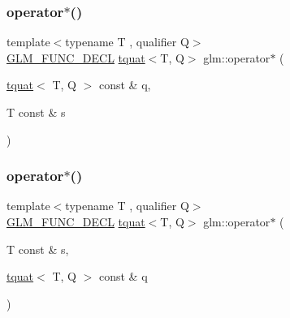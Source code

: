 \subsubsection{\texorpdfstring{operator$\ast$()}{operator*()}\hspace{0.1cm}{\footnotesize\ttfamily [6/7]}}
{\footnotesize\ttfamily template$<$typename T , qualifier Q$>$ \\
\hyperlink{setup_8hpp_ab2d052de21a70539923e9bcbf6e83a51}{G\+L\+M\+\_\+\+F\+U\+N\+C\+\_\+\+D\+E\+CL} \hyperlink{structglm_1_1tquat}{tquat}$<$T, Q$>$ glm\+::operator$\ast$ (\begin{DoxyParamCaption}\item[{\hyperlink{structglm_1_1tquat}{tquat}$<$ T, Q $>$ const \&}]{q,  }\item[{T const \&}]{s }\end{DoxyParamCaption})}

\mbox{\label{group__gtc__quaternion_ga4203f1da1798e6f6dd2549c6daec4e5a}} 
\subsubsection{\texorpdfstring{operator$\ast$()}{operator*()}\hspace{0.1cm}{\footnotesize\ttfamily [7/7]}}
{\footnotesize\ttfamily template$<$typename T , qualifier Q$>$ \\
\hyperlink{setup_8hpp_ab2d052de21a70539923e9bcbf6e83a51}{G\+L\+M\+\_\+\+F\+U\+N\+C\+\_\+\+D\+E\+CL} \hyperlink{structglm_1_1tquat}{tquat}$<$T, Q$>$ glm\+::operator$\ast$ (\begin{DoxyParamCaption}\item[{T const \&}]{s,  }\item[{\hyperlink{structglm_1_1tquat}{tquat}$<$ T, Q $>$ const \&}]{q }\end{DoxyParamCaption})}

\mbox{\label{group__gtc__quaternion_ga415c33d49346428f93089f80cf8f9187}} 
